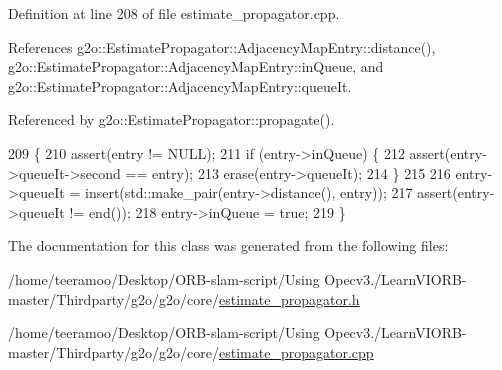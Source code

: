 Definition at line 208 of file estimate\+\_\+propagator.\+cpp.



References g2o\+::\+Estimate\+Propagator\+::\+Adjacency\+Map\+Entry\+::distance(), g2o\+::\+Estimate\+Propagator\+::\+Adjacency\+Map\+Entry\+::in\+Queue, and g2o\+::\+Estimate\+Propagator\+::\+Adjacency\+Map\+Entry\+::queue\+It.



Referenced by g2o\+::\+Estimate\+Propagator\+::propagate().


\begin{DoxyCode}
209   \{
210     assert(entry != NULL);
211     \textcolor{keywordflow}{if} (entry->inQueue) \{
212       assert(entry->queueIt->second == entry);
213       erase(entry->queueIt);
214     \}
215 
216     entry->queueIt = insert(std::make\_pair(entry->distance(), entry));
217     assert(entry->queueIt != end());
218     entry->inQueue = \textcolor{keyword}{true};
219   \}
\end{DoxyCode}


The documentation for this class was generated from the following files\+:\begin{DoxyCompactItemize}
\item 
/home/teeramoo/\+Desktop/\+O\+R\+B-\/slam-\/script/\+Using Opecv3./\+Learn\+V\+I\+O\+R\+B-\/master/\+Thirdparty/g2o/g2o/core/\hyperlink{estimate__propagator_8h}{estimate\+\_\+propagator.\+h}\item 
/home/teeramoo/\+Desktop/\+O\+R\+B-\/slam-\/script/\+Using Opecv3./\+Learn\+V\+I\+O\+R\+B-\/master/\+Thirdparty/g2o/g2o/core/\hyperlink{estimate__propagator_8cpp}{estimate\+\_\+propagator.\+cpp}\end{DoxyCompactItemize}
